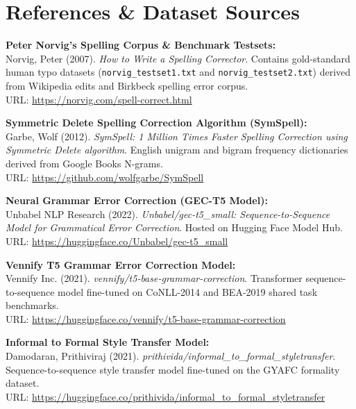 \documentclass[11pt,a4paper]{article}
\begin{document}
\section{References \& Dataset Sources}
\begin{enumerate}[label={[\arabic*]}, leftmargin=2em, itemsep=0.6em]
    \item \textbf{Peter Norvig's Spelling Corpus \& Benchmark Testsets:} \\
    Norvig, Peter (2007). \textit{How to Write a Spelling Corrector}. Contains gold-standard human typo datasets (\texttt{norvig\_testset1.txt} and \texttt{norvig\_testset2.txt}) derived from Wikipedia edits and Birkbeck spelling error corpus. \\
    URL: \url{https://norvig.com/spell-correct.html}

    \item \textbf{Symmetric Delete Spelling Correction Algorithm (SymSpell):} \\
    Garbe, Wolf (2012). \textit{SymSpell: 1 Million Times Faster Spelling Correction using Symmetric Delete algorithm}. English unigram and bigram frequency dictionaries derived from Google Books N-grams. \\
    URL: \url{https://github.com/wolfgarbe/SymSpell}

    \item \textbf{Neural Grammar Error Correction (GEC-T5 Model):} \\
    Unbabel NLP Research (2022). \textit{Unbabel/gec-t5\_small: Sequence-to-Sequence Model for Grammatical Error Correction}. Hosted on Hugging Face Model Hub. \\
    URL: \url{https://huggingface.co/Unbabel/gec-t5_small}

    \item \textbf{Vennify T5 Grammar Error Correction Model:} \\
    Vennify Inc. (2021). \textit{vennify/t5-base-grammar-correction}. Transformer sequence-to-sequence model fine-tuned on CoNLL-2014 and BEA-2019 shared task benchmarks. \\
    URL: \url{https://huggingface.co/vennify/t5-base-grammar-correction}

    \item \textbf{Informal to Formal Style Transfer Model:} \\
    Damodaran, Prithiviraj (2021). \textit{prithivida/informal\_to\_formal\_styletransfer}. Sequence-to-sequence style transfer model fine-tuned on the GYAFC formality dataset. \\
    URL: \url{https://huggingface.co/prithivida/informal_to_formal_styletransfer}


\end{enumerate}
\end{document}
